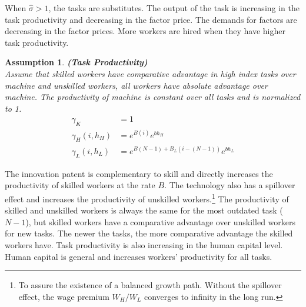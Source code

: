 \documentclass[12pt]{article}
\newtheorem{assumption}{Assumption}
\begin{document}
When $\hat{\sigma}>1$, the tasks are substitutes. The output of the task is increasing in the task productivity and decreasing in the factor price. The demands for factors are decreasing in the factor prices. More workers are hired when they have higher task productivity. 


\begin{assumption}{\bf (Task Productivity)} \\

Assume that skilled workers have comparative advantage in high index tasks over machine and unskilled workers, all workers have absolute advantage over machine. The productivity of machine is constant over all tasks and is normalized to 1. 
\begin{align*}
\gamma_K &= 1 \\
\gamma_H(i,h_H) &=e^{B(i)} e^{bh_H} \\
\gamma_L(i,h_L) &= e^{B(N-1)+B_L(i-(N-1))} e^{bh_L}
\end{align*}
\end{assumption}

The innovation patent is complementary to skill and directly increases the productivity of skilled workers at the rate $B$. The technology also has a spillover effect and increases the productivity of unskilled workers.\footnote{To assure the existence of a balanced growth path. Without the spillover effect, the wage premium $W_H/W_L$ converges to infinity in the long run.} The productivity of skilled and unskilled workers is always the same for the most outdated task ($N-1$), but skilled workers have a comparative advantage over unskilled workers for new tasks. The newer the tasks, the more comparative advantage the skilled workers have. Task productivity is also increasing in the human capital level. Human capital is general and increases workers' productivity for all tasks.  
\end{document}
